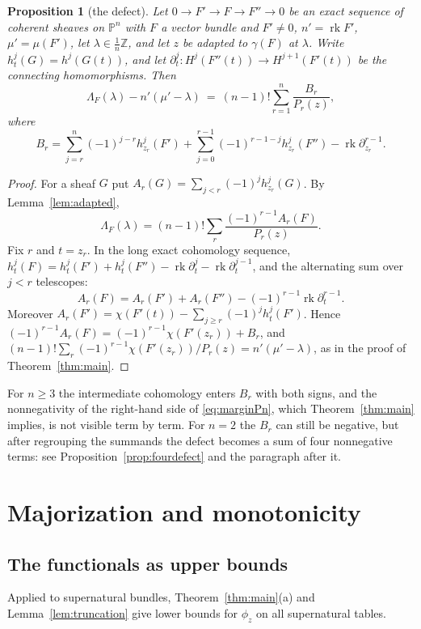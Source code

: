 \documentclass[11pt]{amsart}
\newtheorem{proposition}[theorem]{Proposition}
\theoremstyle{definition}
\theoremstyle{remark}
\newcommand{\PP}{\mathbb{P}}
\newcommand{\ZZ}{\mathbb{Z}}
\DeclareMathOperator{\rk}{rk}
\begin{document}
\begin{proposition}[the defect]\label{prop:marginPn}
Let $0\to F'\to F\to F''\to0$ be an exact sequence of coherent sheaves on $\PP^n$ with $F$ a vector bundle and $F'\ne0$, $n'=\rk F'$, $\mu'=\mu(F')$, let $\lambda\in\frac1n\ZZ$, and let $z$ be adapted to $\gamma(F)$ at $\lambda$. Write $h^j_t(G)=h^j(G(t))$, and let $\partial^j_t\colon H^j(F''(t))\to H^{j+1}(F'(t))$ be the connecting homomorphisms. Then
\begin{equation}\label{eq:marginPn}
\Lambda_F(\lambda)-n'(\mu'-\lambda)\ =\ (n-1)!\sum_{r=1}^n\frac{B_r}{P_r(z)},
\end{equation}
where
\[
B_r=\sum_{j=r}^{n}(-1)^{j-r}h^j_{z_r}(F')+\sum_{j=0}^{r-1}(-1)^{r-1-j}h^j_{z_r}(F'')-\rk\partial^{r-1}_{z_r}.
\]
\end{proposition}

\begin{proof}
For a sheaf $G$ put $A_r(G)=\sum_{j<r}(-1)^jh^j_{z_r}(G)$. By Lemma~\ref{lem:adapted},
\[
\Lambda_F(\lambda)=(n-1)!\sum_r\frac{(-1)^{r-1}A_r(F)}{P_r(z)} .
\]
Fix $r$ and $t=z_r$. In the long exact cohomology sequence, $h^j_t(F)=h^j_t(F')+h^j_t(F'')-\rk\partial^j_t-\rk\partial^{j-1}_t$, and the alternating sum over $j<r$ telescopes:
\[
A_r(F)=A_r(F')+A_r(F'')-(-1)^{r-1}\rk\partial^{r-1}_t .
\]
Moreover $A_r(F')=\chi(F'(t))-\sum_{j\ge r}(-1)^jh^j_t(F')$. Hence $(-1)^{r-1}A_r(F)=(-1)^{r-1}\chi(F'(z_r))+B_r$, and $(n-1)!\sum_r(-1)^{r-1}\chi(F'(z_r))/P_r(z)=n'(\mu'-\lambda)$, as in the proof of Theorem~\ref{thm:main}.
\end{proof}

For $n\ge3$ the intermediate cohomology enters $B_r$ with both signs, and the nonnegativity of the right-hand side of \eqref{eq:marginPn}, which Theorem~\ref{thm:main} implies, is not visible term by term. For $n=2$ the $B_r$ can still be negative, but after regrouping the summands the defect becomes a sum of four nonnegative terms: see Proposition~\ref{prop:fourdefect} and the paragraph after it.

\section{Majorization and monotonicity}\label{sec:monotone}

\subsection{The functionals as upper bounds}
Applied to supernatural bundles, Theorem~\ref{thm:main}(a) and Lemma~\ref{lem:truncation} give lower bounds for $\phi_z$ on all supernatural tables.
\end{document}
